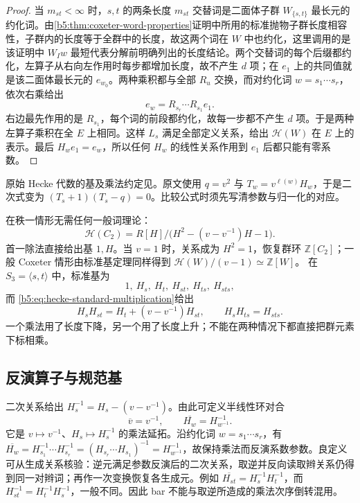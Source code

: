 \begin{proof}
	当 \(m_{st}<\infty\) 时，\(s,t\) 的两条长度 \(m_{st}\) 交替词是二面体子群 \(W_{\{s,t\}}\) 最长元的约化词。由\cref{b5:thm:coxeter-word-properties}证明中所用的标准抛物子群长度相容性，子群内的长度等于全群中的长度，故这两个词在 \(W\) 中也约化，这里调用的是该证明中 \(W_Iw\) 最短代表分解前明确列出的长度结论。两个交替词的每个后缀都约化，左算子从右向左作用时每步都增加长度，故不产生 \(d\) 项；在 \(e_1\) 上的共同值就是该二面体最长元的 \(e_{w_0}\)。两种乘积都与全部 \(R_u\) 交换，而对约化词 \(w=s_1\cdots s_r\)，依次右乘给出
	\[
		e_w=R_{s_r}\cdots R_{s_1}e_1.
	\]
	右边最先作用的是 \(R_{s_1}\)，每个词的前段都约化，故每一步都不产生 \(d\) 项。于是两种左算子乘积在全 \(E\) 上相同。这样 \(L_s\) 满足全部定义关系，给出 \(\mathcal H(W)\) 在 \(E\) 上的表示。最后 \(H_we_1=e_w\)，所以任何 \(H_w\) 的线性关系作用到 \(e_1\) 后都只能有零系数。
\end{proof}

原始 Hecke 代数的基及乘法约定见\cite[Section 1, p. 165]{KazhdanLusztig1979Hecke}。原文使用 \(q=v^2\) 与 \(T_w=v^{\ell(w)}H_w\)，于是二次式变为 \((T_s+1)(T_s-q)=0\)。比较公式时须先写清参数与归一化的对应。

\ProseParagraphBreak
在秩一情形无需任何一般词理论：
\[
	\mathcal H(C_2)=R[H]/\bigl(H^2-(v-v^{-1})H-1\bigr).
\]
首一除法直接给出基 \(1,H\)。当 \(v=1\) 时，关系成为 \(H^2=1\)，恢复群环 \(\mathbb Z[C_2]\)；一般 Coxeter 情形由标准基定理同样得到 \(\mathcal H(W)/(v-1)\simeq\mathbb Z[W]\)。
\ProseParagraphBreak
在 \(S_3=\langle s,t\rangle\) 中，标准基为
\[
	1,\ H_s,\ H_t,\ H_{st},\ H_{ts},\ H_{sts},
\]
而 \eqref{b5:eq:hecke-standard-multiplication}给出
\[
	H_sH_{st}=H_t+(v-v^{-1})H_{st},\qquad H_sH_{ts}=H_{sts}.
\]
一个乘法用了长度下降，另一个用了长度上升；不能在两种情况下都直接把群元素下标相乘。

\subsection{反演算子与规范基}
\label{b5:subsec:A04:02}

二次关系给出 \(H_s^{-1}=H_s-(v-v^{-1})\)。由此可定义半线性环对合
\[
	\overline v=v^{-1},\qquad \overline{H_w}=H_{w^{-1}}^{-1}.
\]
它是 \(v\mapsto v^{-1}\)、\(H_s\mapsto H_s^{-1}\) 的乘法延拓。沿约化词 \(w=s_1\cdots s_r\)，有 \(\overline{H_w}=H_{s_1}^{-1}\cdots H_{s_r}^{-1}=(H_{s_r}\cdots H_{s_1})^{-1}=H_{w^{-1}}^{-1}\)，故保持乘法而反演系数参数。良定义可从生成关系核验：逆元满足参数反演后的二次关系，取逆并反向读取辫关系仍得到同一对辫词；再作一次变换恢复各生成元。例如 \(\overline{H_{st}}=H_s^{-1}H_t^{-1}\)，而 \(H_{st}^{-1}=H_t^{-1}H_s^{-1}\)，一般不同。因此 bar 不能与取逆所造成的乘法次序倒转混用。

